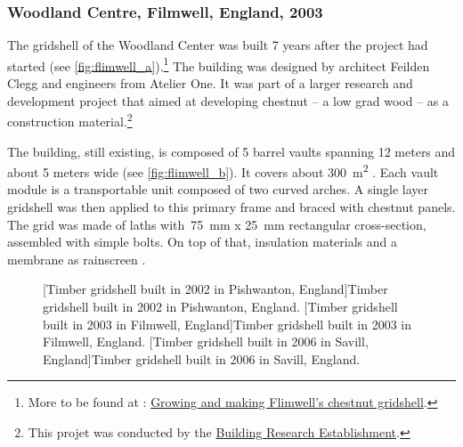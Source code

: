 \subsubsection{Woodland Centre, Filmwell, England, 2003}
The gridshell of the Woodland Center was built 7 years after the project had started (see \cref{fig:flimwell_a}).\footnote{More to be found at : \href{http://www.fourthdoor.org/annular/?page_id=441}{Growing and making Flimwell’s chestnut gridshell}.} The building was designed by architect Feilden Clegg and engineers from Atelier One. It was part of a larger research and development project that aimed at developing chestnut -- a low grad wood -- as a construction material.\footnote{This projet was conducted by the \href{http://www.bre.co.uk/}{Building Research Establishment}.}

The building, still existing, is composed of 5 barrel vaults spanning 12 meters and about 5 meters wide (see \cref{fig:flimwell_b}). It covers about \SI{300}{m^2} \cite{Lowenstein2004}. Each vault module is a transportable unit composed of two curved arches. A single layer gridshell was then applied to this primary frame and braced with chestnut panels. The grid was made of laths with~\SI{75}{mm} x \SI{25}{mm} rectangular cross-section, assembled with simple bolts. On top of that, insulation materials and a membrane as rainscreen \cite{FourthDoor2003}.

\begin{figure}[p]
     	\centering
		\hspace*{\fill}
		\vspace{10pt}
		[Timber gridshell built in 2002 in Pishwanton, England]{Timber gridshell built in 2002 in Pishwanton, England.}
		\label{fig:pishwanton} 
		\vspace{0.5cm}
		\hspace*{\fill}
		\vspace{10pt}
		[Timber gridshell built in 2003 in Filmwell, England]{Timber gridshell built in 2003 in Filmwell, England.}
		\label{fig:flimwell}
		\vspace{0.5cm}
		\hspace*{\fill}
		\vspace{10pt}
		[Timber gridshell built in 2006 in Savill, England]{Timber gridshell built in 2006 in Savill, England.}
		\label{fig:savill} 
\end{figure}

